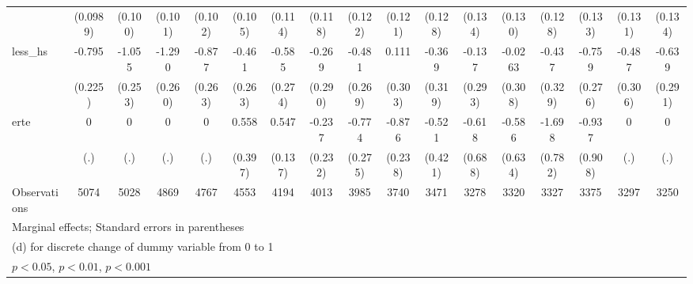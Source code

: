 {\begin{tabular}{l*{16}{c}}
                    &    (0.0989)         &     (0.100)         &     (0.101)         &     (0.102)         &     (0.105)         &     (0.114)         &     (0.118)         &     (0.122)         &     (0.121)         &     (0.128)         &     (0.134)         &     (0.130)         &     (0.128)         &     (0.133)         &     (0.131)         &     (0.134)         \\
[1em]
less\_hs             &      -0.795\sym{***}&      -1.055\sym{***}&      -1.290\sym{***}&      -0.877\sym{***}&      -0.461         &      -0.585\sym{*}  &      -0.269         &      -0.481         &       0.111         &      -0.369         &      -0.137         &     -0.0263         &      -0.437         &      -0.759\sym{**} &      -0.487         &      -0.639\sym{*}  \\
                    &     (0.225)         &     (0.253)         &     (0.260)         &     (0.263)         &     (0.263)         &     (0.274)         &     (0.290)         &     (0.269)         &     (0.303)         &     (0.319)         &     (0.293)         &     (0.308)         &     (0.329)         &     (0.276)         &     (0.306)         &     (0.291)         \\
[1em]
erte                &           0         &           0         &           0         &           0         &       0.558         &       0.547\sym{***}&      -0.237         &      -0.774\sym{**} &      -0.876\sym{***}&      -0.521         &      -0.618         &      -0.586         &      -1.698\sym{*}  &      -0.937         &           0         &           0         \\
                    &         (.)         &         (.)         &         (.)         &         (.)         &     (0.397)         &     (0.137)         &     (0.232)         &     (0.275)         &     (0.238)         &     (0.421)         &     (0.688)         &     (0.634)         &     (0.782)         &     (0.908)         &         (.)         &         (.)         \\
\hline
Observations        &        5074         &        5028         &        4869         &        4767         &        4553         &        4194         &        4013         &        3985         &        3740         &        3471         &        3278         &        3320         &        3327         &        3375         &        3297         &        3250         \\
\hline\hline
\multicolumn{17}{l}{\footnotesize Marginal effects; Standard errors in parentheses}\\
\multicolumn{17}{l}{\footnotesize  (d) for discrete change of dummy variable from 0 to 1}\\
\multicolumn{17}{l}{\footnotesize \sym{*} \(p<0.05\), \sym{**} \(p<0.01\), \sym{***} \(p<0.001\)}\\
\end{tabular}
}
